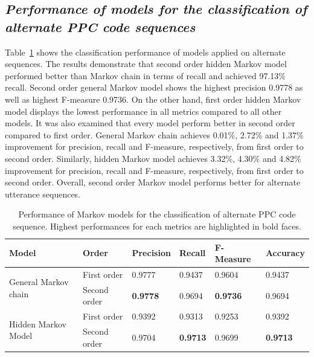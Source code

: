 \documentclass{amia}
\begin{document}
\subsection*{\textit{Performance of models for the classification of alternate PPC code sequences}}
Table~\ref{tab:result_alt_seq} shows the classification performance of models applied on alternate sequences. The results demonstrate that second order hidden Markov model performed better than Markov chain in terms of recall and achieved 97.13\% recall. Second order general Markov model shows the highest precision 0.9778 as well as highest F-measure 0.9736. On the other hand, first order hidden Markov model displays the lowest performance in all metrics compared to all other models. It was also examined that every model perform better in second order compared to first order. General Markov chain achieves 0.01\%, 2.72\% and 1.37\% improvement for precision, recall and F-measure, respectively, from first order to second order. Similarly, hidden Markov model achieves 3.32\%, 4.30\% and 4.82\% improvement for precision, recall and F-measure, respectively, from first order to second order. Overall, second order Markov model performs better for alternate utterance sequences. \\

\begin{table}[h]
\centering
\caption{Performance of Markov models for the classification of alternate PPC code sequence. Highest performances for each metrics are highlighted in bold faces.}
\label{tab:result_alt_seq}
  \begin{tabular}{|l|l|l|l|l|l|}
  \hline
   \textbf{Model} & \textbf{Order}  & \textbf{Precision}  & \textbf{Recall} & \textbf{F-Measure} & \textbf{Accuracy}\\ \hline    
    
 \multirow{2}{*}{General Markov chain} & First order & 0.9777 & 0.9437 & 0.9604 & 0.9437\\\cline{2-6}
 & Second order & \textbf{0.9778} & 0.9694 & \textbf{0.9736} & 0.9694\\ \hline
 \multirow{2}{*}{Hidden Markov Model} & First order & 0.9392 & 0.9313 & 0.9253 & 0.9392\\ \cline{2-6}
 & Second order & 0.9704 & \textbf{0.9713} & 0.9699  & \textbf{0.9713}\\ \hline
 
  \end{tabular}
\end{table}
\end{document}
